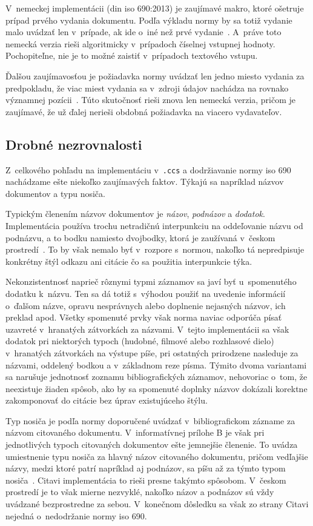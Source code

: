 \documentclass[
  color,
  table,
  nolof,
  oneside,
]{fithesis3}
\begin{document}
V~nemeckej implementácii (\gls{din} \gls{iso} 690:2013) je zaujímavé makro, ktoré ošetruje prípad prvého vydania dokumentu. Podľa výkladu normy by sa totiž vydanie malo uvádzať len v~prípade, ak ide o~iné než prvé vydanie~\cite{csn:iso690:2011}. A~práve toto nemecká verzia rieši algoritmicky v~prípadoch číselnej vstupnej hodnoty. Pochopiteľne, nie je to možné zaistiť v~prípadoch textového vstupu.

Ďalšou zaujímavosťou je požiadavka normy uvádzať len jedno miesto vydania za predpokladu, že viac miest vydania sa v~zdroji údajov nachádza na rovnako významnej pozícii~\cite{csn:iso690:2011}. Túto skutočnosť rieši znova len nemecká verzia, pričom je zaujímavé, že už ďalej nerieši obdobná požiadavka na viacero vydavateľov.

\subsection{Drobné nezrovnalosti}

Z~celkového pohľadu na implementáciu v~\texttt{.ccs} a dodržiavanie normy \gls{iso} 690 nachádzame ešte niekoľko zaujímavých faktov. Týkajú sa napríklad názvov dokumentov a typu nosiča.

Typickým členením názvov dokumentov je \emph{názov}, \emph{podnázov} a \emph{dodatok}. Implementácia používa trochu netradičnú interpunkciu na oddeľovanie názvu od podnázvu, a to bodku namiesto dvojbodky, ktorá je zaužívaná v~českom prostredí~\cite{Biernatova2011, Bratkova2011}. To by však nemalo byť v~rozpore s~normou, nakoľko tá nepredpisuje konkrétny štýl odkazu ani citácie čo sa použitia interpunkcie týka.

Nekonzistentnosť naprieč rôznymi typmi záznamov sa javí byť u~spomenutého dodatku k~názvu. Ten sa dá totiž s~výhodou použiť na uvedenie informácií o~ďalšom názve, opravu nesprávnych alebo doplnenie nejasných názvov, ich preklad apod. Všetky spomenuté prvky však norma naviac odporúča písať uzavreté v~hranatých zátvorkách za názvami. V~tejto implementácii sa však dodatok pri niektorých typoch (hudobné, filmové alebo rozhlasové dielo) v~hranatých zátvorkách na výstupe píše, pri ostatných prirodzene nasleduje za názvami, oddelený bodkou a v~základnom reze písma. Týmito dvoma variantami sa narušuje jednotnosť zoznamu bibliografických záznamov, nehovoriac o~tom, že neexistuje žiaden spôsob, ako by sa spomenuté doplnky názvov dokázali korektne zakomponovať do citácie bez úprav existujúceho štýlu.

Typ nosiča je podľa normy doporučené uvádzať v~bibliografickom zázname za názvom citovaného dokumentu. V~informatívnej prílohe B je však pri jednotlivých typoch citovaných dokumentov ešte jemnejšie členenie. To uvádza umiestnenie typu nosiča za hlavný názov citovaného dokumentu, pričom vedľajšie názvy, medzi ktoré patrí napríklad aj podnázov, sa píšu až za týmto typom nosiča~\cite{csn:iso690:2011}. Citavi implementácia to rieši presne takýmto spôsobom. V~českom prostredí je to však mierne nezvyklé, nakoľko názov a podnázov sú vždy uvádzané bezprostredne za sebou. V~konečnom dôsledku sa však zo strany Citavi nejedná o~nedodržanie normy \gls{iso} 690.
\end{document}
